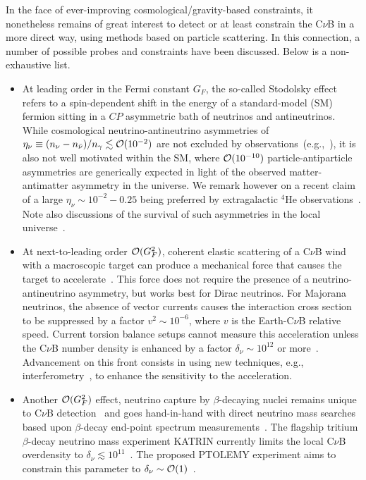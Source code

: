 \documentclass[aps,prd,10pt,twocolumn,superscriptaddress,floatfix,nofootinbib,amsmath,amssymb,altaffilletter,preprintnumbers]{revtex4-1}
\begin{document}
In the face of ever-improving cosmological/gravity-based constraints, it nonetheless remains of great interest to detect or at least constrain the C$\nu$B in a more direct way, using methods based on particle scattering.  In this connection, a number of possible probes and constraints have been discussed.  Below is a non-exhaustive list.
\begin{itemize}
 \item At leading order in the Fermi constant $G_F$, the so-called Stodolsky effect~\cite{Stodolsky:1974aq} refers to a spin-dependent shift in the energy of a standard-model (SM) fermion sitting in a $CP$ asymmetric bath of neutrinos and antineutrinos.  While cosmological neutrino-antineutrino asymmetries of $\eta_\nu \equiv (n_\nu-n_{\bar{\nu}})/n_\gamma \lesssim {\cal O}(10^{-2})$ are not excluded by observations~(e.g.,~\cite{Oldengott:2017tzj}), it is also not well motivated within the SM, where ${\cal O}(10^{-10})$ particle-antiparticle asymmetries  are generically expected in light of the observed matter-antimatter asymmetry in the universe.  We remark however on a recent claim of a large $\eta_\nu \sim 10^{-2} - 0.25$ being preferred by extragalactic $^4$He observations~\cite{Burns:2022hkq}. Note also discussions of the survival of such asymmetries in the local universe~\cite{Arvanitaki:2022oby,Ruchayskiy:2022eog}.  
 
\item At next-to-leading order ${\cal O}(G_F^2)$, coherent elastic scattering of a C$\nu$B wind with a macroscopic target can produce a mechanical force that causes the target to accelerate~\cite{Shvartsman:1982sn,Langacker:1982ih, Smith:1983jj,Duda:2001hd,Domcke:2017aqj,Shergold:2021evs}. 
This force does not require the presence of a neutrino-antineutrino asymmetry, but works best for Dirac neutrinos.  For Majorana neutrinos, the absence of vector currents causes the interaction cross section to be suppressed by a factor  $v^2 \sim 10^{-6}$, where $v$ is the Earth-C$\nu$B relative speed. Current torsion balance setups cannot measure this acceleration unless the C$\nu$B number density is enhanced by a factor $\delta_\nu \sim 10^{12}$ or more~\cite{Shergold:2021evs}.
Advancement on this front consists in using new techniques, e.g., interferometry~\cite{Domcke:2017aqj}, to enhance the sensitivity to the acceleration.


\item  Another ${\cal O}(G_F^2)$ effect, neutrino capture by $\beta$-decaying nuclei remains unique to C$\nu$B detection~\cite{Weinberg:1962zza,Cocco:2007za,Long:2014zva,Akita:2020jbo} and goes hand-in-hand with direct neutrino mass searches based upon $\beta$-decay end-point spectrum measurements~\cite{KATRIN:2022kkv,KATRIN:2024cdt,Project8:2022wqh}.  The flagship tritium $\beta$-decay neutrino mass experiment KATRIN currently limits the local C$\nu$B overdensity to $\delta_\nu \lesssim 10^{11}$~\cite{KATRIN:2022kkv}.  The proposed PTOLEMY experiment aims to constrain this parameter to $\delta_\nu \sim {\cal O}(1)$~\cite{PTOLEMY:2018jst}.


\end{itemize}
\end{document}
